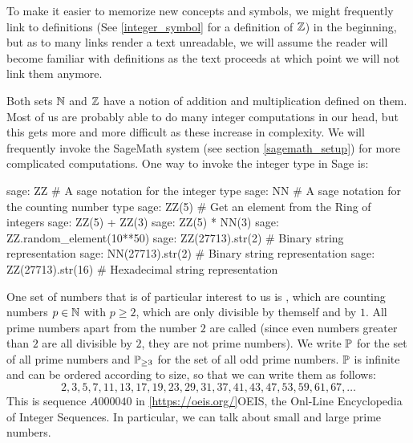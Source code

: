 To make it easier to memorize new concepts and symbols, we might frequently link to definitions (See \ref{integer_symbol} for a definition of $\mathbb{Z}$) in the beginning, but as to many links render a text unreadable, we will assume the reader will become familiar with definitions as the text proceeds at which point we will not link them anymore.

Both sets $\mathbb{N}$ and $\mathbb{Z}$ have a notion of addition and multiplication defined on them. Most of us are probably able to do many integer computations in our head, but this gets more and more difficult as these increase in complexity.  We will frequently invoke the SageMath system (see section \ref{sagemath_setup}) for more complicated computations. One way to invoke the integer type in Sage is: 
\begin{sagecommandline}
sage: ZZ # A sage notation for the integer type
sage: NN # A sage notation for the counting number type
sage: ZZ(5) # Get an element from the Ring of integers
sage: ZZ(5) + ZZ(3)
sage: ZZ(5) * NN(3)
sage: ZZ.random_element(10**50)
sage: ZZ(27713).str(2) # Binary string representation
sage: NN(27713).str(2) # Binary string representation
sage: ZZ(27713).str(16) # Hexadecimal string representation
\end{sagecommandline}
One set of numbers that is of particular interest to us is , which are counting numbers $ p \in \mathbb{N} $ with $ p \geq 2 $, which are only divisible by themself and by $ 1 $. All prime numbers apart from the number $ 2 $ are called  (since even numbers greater than $2$ are all divisible by $2$, they are not prime numbers). We write $ \mathbb{P} $ for the set of all prime numbers and $ \mathbb{P} _{\geq 3} $ for the set of all odd prime numbers.
$\mathbb{P}$ is infinite and can be ordered according to size, so that we can write them as follows:
\begin{equation}
\label{eq: primenumber_sequence}
2, 3, 5, 7, 11, 13, 17, 19, 23, 29, 31, 37, 41, 43, 47, 53, 59, 61, 67, \ldots
\end{equation}
This is sequence $ A000040 $ in \ref{https://oeis.org/}{OEIS}, the Onl-Line Encyclopedia of Integer Sequences. In particular, we can talk about small and large prime numbers.


